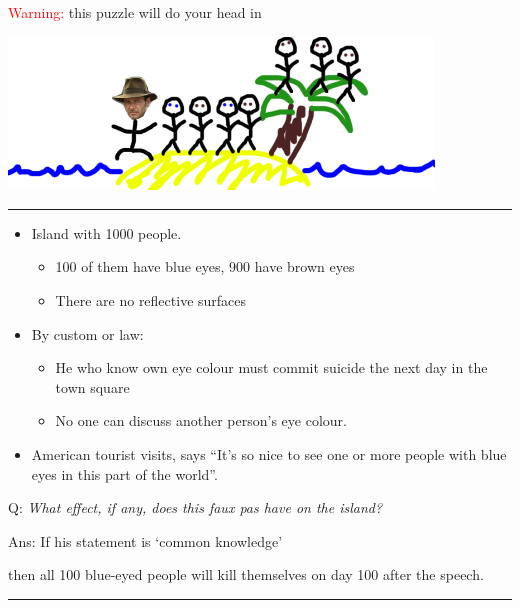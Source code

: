 \documentclass[]{article}
\providecommand{\tightlist}{%
  \setlength{\itemsep}{0pt}\setlength{\parskip}{0pt}}
\begin{document}
\textcolor{red}{Warning:} this puzzle will do your head in

\includegraphics[height=1.6in]{picsfigs/blue-eyed.png}

\begin{center}\rule{0.5\linewidth}{\linethickness}\end{center}

\begin{itemize}
\tightlist
\item
  Island with 1000 people.

  \begin{itemize}
  \tightlist
  \item
    100 of them have blue eyes, 900 have brown eyes
  \item
    There are no reflective surfaces
  \end{itemize}
\item
  By custom or law:

  \begin{itemize}
  \tightlist
  \item
    He who know own eye colour must commit suicide the next day in the
    town square
  \item
    No one can discuss another person's eye colour.
  \end{itemize}
\item
  American tourist visits, says ``It's so nice to see one or more people
  with blue eyes in this part of the world''.
\end{itemize}

\bigskip

Q: \emph{What effect, if any, does this faux pas have on the island?}

\bigskip

Ans: If his statement is `common knowledge'

then all 100 blue-eyed people will kill themselves on day 100 after the
speech.

\begin{center}\rule{0.5\linewidth}{\linethickness}\end{center}
\end{document}

